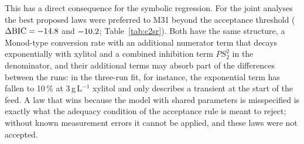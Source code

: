 This has a direct consequence for the symbolic regression. For the joint analyses the best proposed laws were preferred to M31 beyond the acceptance threshold ($\Delta\mathrm{BIC}=-14.8$ and $-10.2$; Table~\ref{tab:c2sr}). Both have the same structure, a Monod-type conversion rate with an additional numerator term that decays exponentially with xylitol and a combined inhibition term $PS_2^2$ in the denominator, and their additional terms may absorb part of the differences between the runs: in the three-run fit, for instance, the exponential term has fallen to 10\,\% at 3\,g\,L$^{-1}$ xylitol and only describes a transient at the start of the feed. A law that wins because the model with shared parameters is misspecified is exactly what the adequacy condition of the acceptance rule is meant to reject; without known measurement errors it cannot be applied, and these laws were not accepted.
